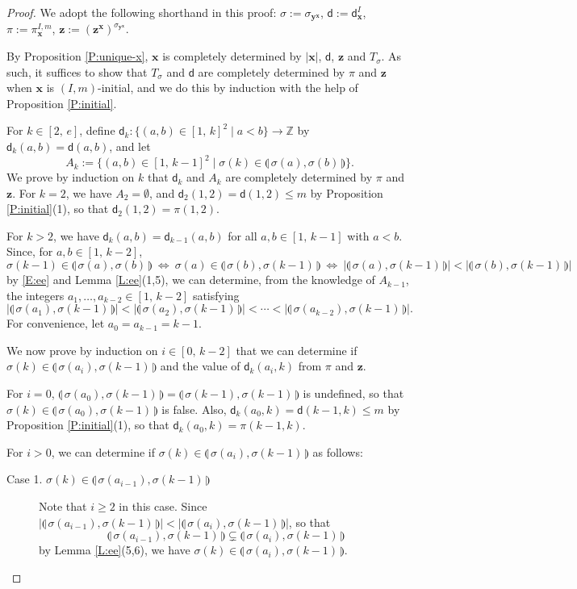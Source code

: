 \documentclass[11pt,a4paper,reqno]{amsart}
\numberwithin{equation}{section}
\theoremstyle{plain}
\theoremstyle{definition}
\theoremstyle{remark}
\numberwithin{equation}{section}
\newcommand{\bx}{\mathbf{x}}
\newcommand{\by}{\mathbf{y}}
\newcommand{\bz}{\mathbf{z}}
\newcommand{\dd}{\mathsf{d}}
\newcommand{\ft}[2]{\llparenthesis\, #1,#2 \,\rrparenthesis}
\begin{document}
\begin{proof}
We adopt the following shorthand in this proof: $\sigma := \sigma_{\by^{\bx}}$, $\dd := \dd_{\bx}^I$,
$\pi := \pi_{\bx}^{I,m}$, $\bz := (\bz^{\bx})^{\sigma_{\by^{\bx}}}$.

By Proposition \ref{P:unique-x}, $\bx$ is completely determined by $|\bx|$, $\dd$, $\bz$ and $T_{\sigma}$.
As such, it suffices to show that $T_{\sigma}$ and $\dd$ are completely determined by $\pi$ and $\bz$ when $\bx$ is $(I,m)$-initial, and we do this by induction with the help of Proposition \ref{P:initial}.

For $k \in [2,\,e]$, define $\dd_k : \{ (a,b) \in [1,\,k]^2 \mid a < b \} \to \mathbb{Z}$ by $\dd_k(a,b) = \dd(a,b)$, and let $$A_k := \{ (a,b) \in [1,\,k-1]^2 \mid \sigma(k) \in \ft{\sigma(a)}{\sigma(b)} \}.$$
We prove by induction on $k$ that $\dd_k$ and $A_k$ are completely determined by $\pi$ and $\bz$.
For $k = 2$, we have $A_2 = \emptyset$, and $\dd_2(1,2) = \dd(1,2) \leq m$ by Proposition \ref{P:initial}(1), so that $\dd_2(1,2) = \pi(1,2)$.

For $k > 2$,
we have $\dd_k(a,b) = \dd_{k-1}(a,b)$ for all $a,b \in [1,\, k-1]$ with $a < b$.
Since, for $a,b \in [1,\, k-2]$,
$$
\sigma(k-1) \in \ft{\sigma(a)}{\sigma(b)}\ \Leftrightarrow\ \sigma(a) \in \ft{\sigma(b)}{\sigma(k-1)} \ \Leftrightarrow\ |\ft{\sigma(a)}{\sigma(k-1)}| <  |\ft{\sigma(b)}{\sigma(k-1)}| %
$$
by \eqref{E:ee} and Lemma \ref{L:ee}(1,5),
we can determine, from the knowledge of $A_{k-1}$, the integers
$a_1, \dotsc, a_{k-2} \in [1,\,k-2]$ satisfying
$$
|\ft{\sigma(a_1)}{\sigma(k-1)}| < |\ft{\sigma(a_2)}{\sigma(k-1)}| < \dotsb < |\ft{\sigma(a_{k-2})}{\sigma(k-1)}|.
$$
For convenience, let $a_{0} = a_{k-1} = k-1$. 

We now prove by induction on $i \in [0,\, k-2]$ that we can determine if $\sigma(k) \in \ft{\sigma(a_i)}{\sigma(k-1)}$ and the value of $\dd_k(a_i,k)$ from $\pi$ and $\bz$.

For $i = 0$, $\ft{\sigma(a_0)}{\sigma(k-1)} = \ft{\sigma(k-1)}{\sigma(k-1)}$ is undefined, so that $\sigma(k) \in \ft{\sigma(a_0)}{\sigma(k-1)}$ is false.
Also, $\dd_k(a_0,k) = \dd(k-1,k) \leq m$ by Proposition \ref{P:initial}(1), so that $\dd_k(a_0,k) = \pi(k-1,k)$.

For $i > 0$, we can determine if $\sigma(k) \in \ft{\sigma(a_i)}{\sigma(k-1)}$ as follows:
\begin{description}
\item[Case 1. $\sigma(k) \in \ft{\sigma(a_{i-1})}{\sigma(k-1)}$]
Note that $i \geq 2$ in this case. 
Since
$|\ft{\sigma(a_{i-1})}{\sigma(k-1)}| < |\ft{\sigma(a_i)}{\sigma(k-1)}|$, so that
$$\ft{\sigma(a_{i-1})}{\sigma(k-1)} \subsetneq \ft{\sigma(a_i)}{\sigma(k-1)}$$
by Lemma \ref{L:ee}(5,6), we have
$\sigma(k) \in \ft{\sigma(a_i)}{\sigma(k-1)}$.


\end{description}
\end{proof}
\end{document}
